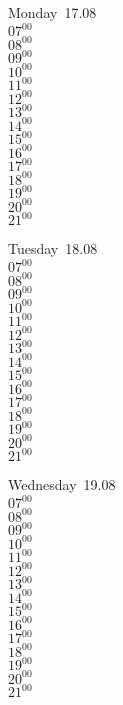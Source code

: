\documentclass[11pt,a4paper]{book}\usepackage[]{graphicx}\usepackage[]{color}
\begin{document}
\begin{headerbox}
\end{headerbox}
\begin{weekdaybox}
  Monday~17.08\\
  { 
  \vfill
  $07^{00}$\\
$08^{00}$\\
$09^{00}$\\
$10^{00}$\\
$11^{00}$\\
$12^{00}$\\
$13^{00}$\\
$14^{00}$\\
$15^{00}$\\
$16^{00}$\\
$17^{00}$\\
$18^{00}$\\
$19^{00}$\\
$20^{00}$\\
$21^{00}$\\
  }
\end{weekdaybox}
\begin{weekdaybox}
  Tuesday~18.08\\
  { 
  \vfill
  $07^{00}$\\
$08^{00}$\\
$09^{00}$\\
$10^{00}$\\
$11^{00}$\\
$12^{00}$\\
$13^{00}$\\
$14^{00}$\\
$15^{00}$\\
$16^{00}$\\
$17^{00}$\\
$18^{00}$\\
$19^{00}$\\
$20^{00}$\\
$21^{00}$\\
  }
\end{weekdaybox}
\begin{weekdaybox}
  Wednesday~19.08\\
  { 
  \vfill
  $07^{00}$\\
$08^{00}$\\
$09^{00}$\\
$10^{00}$\\
$11^{00}$\\
$12^{00}$\\
$13^{00}$\\
$14^{00}$\\
$15^{00}$\\
$16^{00}$\\
$17^{00}$\\
$18^{00}$\\
$19^{00}$\\
$20^{00}$\\
$21^{00}$\\
  }
\end{weekdaybox}
\end{document}
